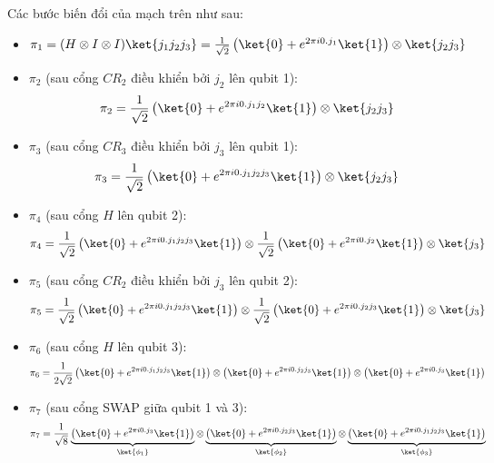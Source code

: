 Các bước biến đổi của mạch trên như sau:
\begin{itemize}
    \item $\pi_1 = (H \otimes I \otimes I) \ket{j_1 j_2 j_3} = \frac{1}{\sqrt{2}} \left( \ket{0} + e^{2\pi i 0.j_1} \ket{1} \right) \otimes \ket{j_2 j_3}$
    
    \item $\pi_2$ (sau cổng $CR_2$ điều khiển bởi $j_2$ lên qubit 1):
    \[ \pi_2 = \frac{1}{\sqrt{2}} \left( \ket{0} + e^{2\pi i 0.j_1 j_2} \ket{1} \right) \otimes \ket{j_2 j_3} \]
    
    \item $\pi_3$ (sau cổng $CR_3$ điều khiển bởi $j_3$ lên qubit 1):
    \[ \pi_3 = \frac{1}{\sqrt{2}} \left( \ket{0} + e^{2\pi i 0.j_1 j_2 j_3} \ket{1} \right) \otimes \ket{j_2 j_3} \]
    
    \item $\pi_4$ (sau cổng $H$ lên qubit 2):
    \[ \pi_4 = \frac{1}{\sqrt{2}} \left( \ket{0} + e^{2\pi i 0.j_1 j_2 j_3} \ket{1} \right) \otimes \frac{1}{\sqrt{2}} \left( \ket{0} + e^{2\pi i 0.j_2} \ket{1} \right) \otimes \ket{j_3} \]
    
    \item $\pi_5$ (sau cổng $CR_2$ điều khiển bởi $j_3$ lên qubit 2):
    \[ \pi_5 = \frac{1}{\sqrt{2}} \left( \ket{0} + e^{2\pi i 0.j_1 j_2 j_3} \ket{1} \right) \otimes \frac{1}{\sqrt{2}} \left( \ket{0} + e^{2\pi i 0.j_2 j_3} \ket{1} \right) \otimes \ket{j_3} \]
    
    \item $\pi_6$ (sau cổng $H$ lên qubit 3):
    \[ \pi_6 = \frac{1}{2\sqrt{2}} \left( \ket{0} + e^{2\pi i 0.j_1 j_2 j_3} \ket{1} \right) \otimes \left( \ket{0} + e^{2\pi i 0.j_2 j_3} \ket{1} \right) \otimes \left( \ket{0} + e^{2\pi i 0.j_3} \ket{1} \right) \]
    
    \item $\pi_7$ (sau cổng SWAP giữa qubit 1 và 3):
    \[ \pi_7 = \frac{1}{\sqrt{8}} \underbrace{\left( \ket{0} + e^{2\pi i 0.j_3} \ket{1} \right)}_{\ket{\phi_1}} \otimes \underbrace{\left( \ket{0} + e^{2\pi i 0.j_2 j_3} \ket{1} \right)}_{\ket{\phi_2}} \otimes \underbrace{\left( \ket{0} + e^{2\pi i 0.j_1 j_2 j_3} \ket{1} \right)}_{\ket{\phi_3}} \]
\end{itemize}

